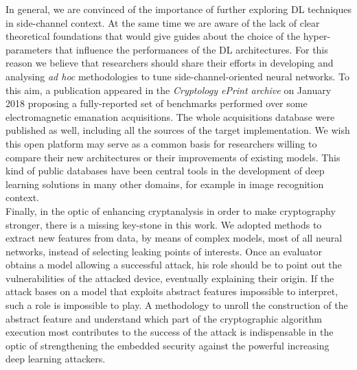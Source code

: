 In general, we are convinced of the importance of further exploring DL techniques in side-channel context. At the same time we are aware of the lack of clear theoretical foundations that would give guides about the choice of the hyper-parameters that influence the performances of the DL architectures. For this reason we believe that researchers should share their efforts in developing and analysing \textit{ad hoc} methodologies to tune side-channel-oriented neural networks. To this aim, a publication appeared in the \emph{Cryptology ePrint archive} on January 2018 \cite{eprintASCADpaper} proposing a fully-reported set of benchmarks performed over some electromagnetic emanation acquisitions. The whole acquisitions database were published as well, including all the sources of the target implementation. We wish this open platform may serve as a common basis for researchers willing to compare their new architectures or their improvements of existing models. This kind of public databases have been central tools in the development of deep learning solutions in many other domains, for example in image recognition context.\\

Finally, in the optic of enhancing cryptanalysis in order to make cryptography stronger, there is a missing key-stone in this work. We adopted methods to extract new features from data, by means of complex models, most of all neural networks, instead of selecting leaking points of interests. Once an evaluator obtains a model allowing a successful attack, his role should be to point out the vulnerabilities of the attacked device, eventually explaining their origin. If the attack bases on a model that exploits abstract features impossible to interpret, such a role is impossible to play. A methodology to unroll the construction of the abstract feature and understand which part of the cryptographic algorithm execution most contributes to the success of the attack is indispensable in the optic of strengthening the embedded security against the powerful increasing deep learning attackers.
